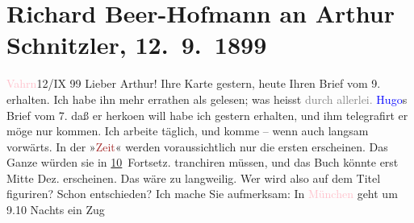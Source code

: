 

               \section[Richard Beer-Hofmann an Arthur Schnitzler, 12. 9. 1899]{ Richard Beer-Hofmann an Arthur Schnitzler, 12. 9. 1899}\nopagebreak{}\rehead{ }\normalsize\beginnumbering{} \toendnotes[C]{\smallbreak\pagebreak[2]} 
\toendnotes[C]{\smallbreak}\pstart
           \raggedleft{}{\pb}\textcolor{pink}{Vahrn}{}\ledrightnote{\textcolor{pink}{Vahrn}}{ }12/IX 99\pend
           \pstart
           Lieber Arthur! Ihre Karte gestern, heute Ihren Brief vom
                  9. erhalten. Ich habe ihn mehr errathen als gelesen; was heisst
                  \textcolor{gray}{durch allerlei.}{ }\textcolor{blue}{Hugo}{}\ledrightnote{\textcolor{blue}{Hugo von Hofmannsthal}}s Brief vom 7. daß er herko{\geminationm}en will habe ich gestern erhalten, und ihm telegrafirt
               er möge nur kommen. Ich arbeite täglich, und komme – wenn auch langsam vorwärts. In
               der »\textcolor{brown}{Zeit}{}\ledrightnote{\textcolor{brown}{Die Zeit. Wiener Wochenschrift}}« werden voraussichtlich nur die ersten
                  \label{K_L00973_1v}\label{K_L00973_1h} erscheinen. Das
               Ganze würden sie in \uline{10} Fortsetz. tranchiren müssen,
               und das Buch könnte erst Mitte Dez. erscheinen. Das wäre zu langweilig. Wer wird also
               auf dem Titel figuriren? Schon entschieden? Ich {\pb}mache Sie aufmerksam: In \textcolor{pink}{München}{}\ledrightnote{\textcolor{pink}{München}} geht um 9.10 Nachts ein Zug

